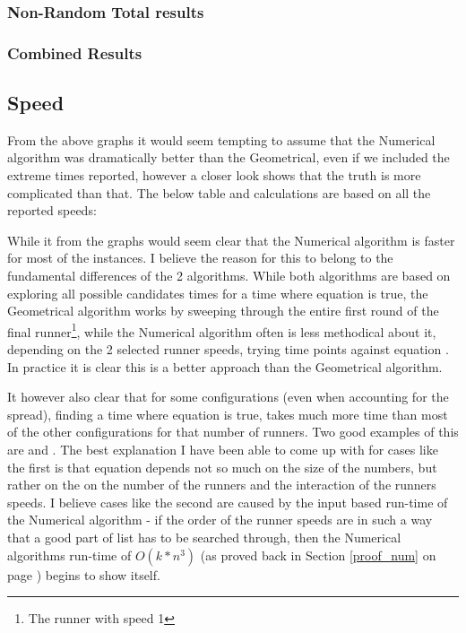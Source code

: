 \subsubsection{Non-Random Total results}





\subsubsection{Combined Results} 





\subsection{Speed}

From the above graphs it would seem tempting to assume that the Numerical algorithm was dramatically better than the Geometrical, even if we included the extreme times reported, however a closer look shows that the truth is more complicated than that. The below table and calculations are based on all the reported speeds:

%

While it from the graphs would seem clear that the Numerical algorithm is faster for most of the instances. 
I believe the reason for this to belong to the fundamental differences of the 2 algorithms. While both algorithms are based on exploring all possible candidates times for a time where equation  is true, the Geometrical algorithm works by sweeping through the entire first round of the final runner\footnote{The runner with speed 1}, while the Numerical algorithm often is less methodical about it, depending on the 2 selected runner speeds, trying time points against equation . In practice it is clear this is a better approach than the Geometrical algorithm.
 
It however also clear that for some configurations (even when accounting for the spread), finding a time where equation  is true, takes much more time than most of the other configurations for that number of runners. Two good examples of this are  and . The best explanation I have been able to come up with for cases like the first is that equation  depends not so much on the size of the numbers, but rather on the on the number of the runners and the interaction of the runners speeds. I believe cases like the second are caused by the input based run-time of the Numerical algorithm - if the order of the runner speeds are in such a way that a good part of list has to be searched through, then the Numerical algorithms run-time of $O(k * n^3)$ (as proved back in Section \ref{proof_num} on page \pageref{proof_num}) begins to show itself.  


